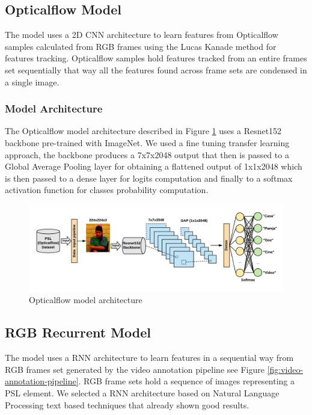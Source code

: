 \documentclass[twocolumn,conference]{article}
\begin{document}
\subsection{Opticalflow Model}\label{opticalflowmodel}
The model uses a 2D CNN architecture to learn features from Opticalflow samples calculated from RGB frames using the Lucas Kanade method for features tracking. Opticalflow samples hold features tracked from an entire frames set sequentially that way all the features found across frame sets are condensed in a single image.
\subsubsection{Model Architecture}\label{opticalflowmodel-architecture}
The Opticalflow model architecture described in Figure \ref{fig:opticalflow-architecture} uses a Resnet152 backbone pre-trained with ImageNet. We used a fine tuning transfer learning approach, the backbone produces a 7x7x2048 output that then is passed to a Global Average Pooling layer for obtaining a flattened output of 1x1x2048 which is then passed to a dense layer for logits computation and finally to a softmax activation function for classes probability computation.
\begin{figure}[hbt!]
\includegraphics[width=\linewidth]{images/opticalflow-model-architecture.png}
\caption{Opticalflow model architecture}
\label{fig:opticalflow-architecture}
\end{figure}


\subsection{RGB Recurrent Model}\label{rgbrecurrentmodel}
The model uses a RNN architecture to learn features in a sequential way from RGB frames set generated by the video annotation pipeline see Figure \ref{fig:video-annotation-pipeline}. RGB frame sets hold a sequence of images representing a PSL element. We selected a RNN architecture based on Natural Language Processing text based techniques that already shown good results.
\end{document}
